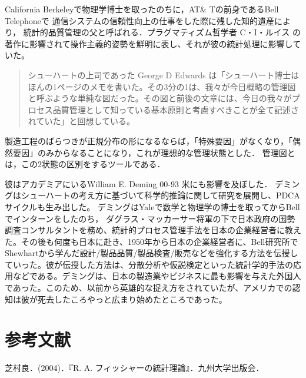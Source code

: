 \documentclass[uplatex,dvipdfmx]{jsreport}
\begin{document}
\begin{history}
    California Berkeleyで物理学博士を取ったのちに，AT\& Tの前身であるBell Telephoneで
    通信システムの信頼性向上の仕事をした際に残した知的遺産により，
    統計的品質管理の父と呼ばれる．プラグマティズム哲学者 C・I・ルイス の著作に影響されて操作主義的姿勢を鮮明に表し、それが彼の統計処理に影響していた。
    \begin{quote}
        シューハートの上司であった George D Edwards は「シューハート博士はほんの1ページのメモを書いた。その3分の1は、我々が今日概略の管理図と呼ぶような単純な図だった。その図と前後の文章には、今日の我々がプロセス品質管理として知っている基本原則と考慮すべきことが全て記述されていた」と回想している。
    \end{quote}
    製造工程のばらつきが正規分布の形になるならば，「特殊要因」がなくなり，「偶然要因」のみからなることになり，これが理想的な管理状態とした．
    管理図とは，この2状態の区別をするツールである．

    彼はアカデミアにいるWilliam E. Deming 00-93 米にも影響を及ぼした．
    デミングはシューハートの考え方に基づいて科学的推論に関して研究を展開し、PDCAサイクルも生み出した。 
    デミングはYaleで数学と物理学の博士を取ってからBellでインターンをしたのち，
    ダグラス・マッカーサー将軍の下で日本政府の国勢調査コンサルタントを務め、統計的プロセス管理手法を日本の企業経営者に教えた。その後も何度も日本に赴き、1950年から日本の企業経営者に、Bell研究所で
    Shewhartから学んだ設計/製品品質/製品検査/販売などを強化する方法を伝授していった。彼が伝授した方法は、分散分析や仮説検定といった統計学的手法の応用などである。デミングは、日本の製造業やビジネスに最も影響を与えた外国人であった。このため、以前から英雄的な捉え方をされていたが、アメリカでの認知は彼が死去したころやっと広まり始めたところであった。
\end{history}

\chapter{参考文献}

\begin{thebibliography}{99}
    芝村良．(2004)．『R. A. フィッシャーの統計理論』．九州大学出版会．
\end{thebibliography}
\end{document}
